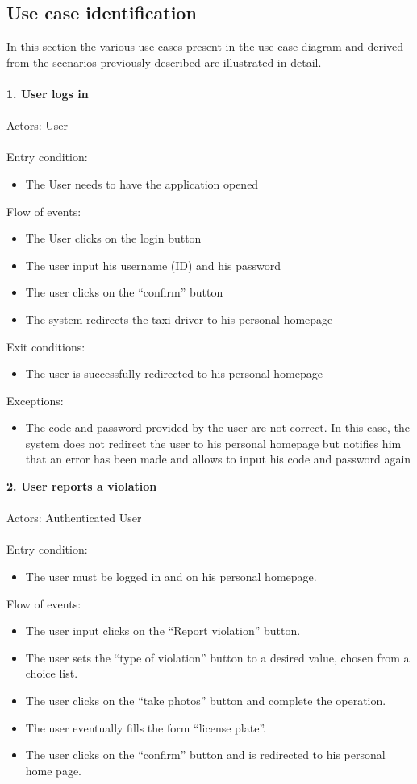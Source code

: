 \documentclass[a4paper]{report}
\begin{document}
\subsection{Use case identification}
In this section the various use cases present in the use case diagram and derived from the scenarios previously described are illustrated in detail.\\ \\
\textbf{1. User logs in}\label{uc:1}
\\
\\
Actors: User\\ \\
Entry condition: 
\begin{itemize}
\item The User needs to have the application opened
\end{itemize}
Flow of events:
\begin{itemize}
\item The User clicks on the login button
\item The user input his username (ID) and his password
\item The user clicks on the “confirm” button
\item The system redirects the taxi driver to his personal homepage
\end{itemize}
Exit conditions: 
\begin{itemize}
\item The user is successfully redirected to his personal homepage
\end{itemize}
Exceptions: 
\begin{itemize}
\item The code and password provided by the user are not correct. In this case, the system does not redirect the user to his personal homepage but notifies him that an error has been made and allows to input his code and password again
\end{itemize}
\textbf{2. User reports a violation}\label{uc:2} \\ \\
Actors: Authenticated User\\ \\
Entry condition:
\begin{itemize}
 \item The user must be logged in and on his personal homepage.
 \end{itemize}
Flow of events:
 \begin{itemize}
\item The user input clicks on the “Report violation” button.
\item The user sets the “type of violation” button to a desired value, chosen from a choice list.
\item The user clicks on the “take photos” button and complete the operation.
\item The user eventually fills the form “license plate”.
\item The user clicks on the “confirm” button and is redirected to his personal home page.
\end{itemize}
\end{document}
